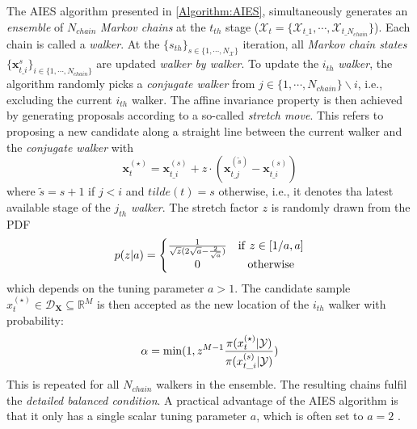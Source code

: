 The \acrshort{AIES} algorithm presented in \ref{Algorithm:AIES}, simultaneously generates an \textit{ensemble} of $N_{chain}$ \textit{Markov chains} at the $t_{th}$ stage ($\mathcal{X}_{t} = \{ \mathcal{X}_{t\_1},\cdots,\mathcal{X}_{t\_N_{chain}}\}$). Each chain is called a \textit{walker}. At the $\{s_{th}\}_{s \in \{1,\cdots,N_{\mathcal{X}}\}}$ iteration, all \textit{Markov chain states} $\{\boldsymbol{x}_{t\_i}^{s}\}_{i \in \{1,\cdots,N_{chain}\}}$ are updated \textit{walker by walker}. To update the $i_{th}$ \textit{walker}, the algorithm randomly picks a \textit{conjugate walker} from $j \in \{ 1,\cdots,N_{chain}\} \backslash i$, i.e., excluding the current $i_{th}$ walker. The affine invariance property is then achieved by generating proposals according to a so-called \textit{stretch move}. This refers to proposing a new candidate along a straight line between the current walker and the \textit{conjugate walker} with
\begin{equation}
    \label{eq: AIES walker}
\boldsymbol{x}_{t}^{(\star)}
=
\boldsymbol{x}_{t\_i}^{(s)}
+
z \cdot 
(\boldsymbol{x}_{t\_j}^{(\tilde{s})} - \boldsymbol{x}_{t\_i}^{(s)})
\end{equation}
where $\tilde{s} = s +1$ if $j < i$ and $tilde(t)=s$ otherwise, i.e., it denotes tha latest available stage of the $j_{th}$ \textit{walker}. The stretch factor $z$ is randomly drawn from the \acrshort{PDF}
\begin{equation}
    \label{eq: AIES Z}
    p(z|a)= \left\{\begin{matrix}
  \frac{1}{\sqrt{z} (2\sqrt{a} - \frac{2}{\sqrt{a} } )}  & {\rm{if} }\ z \in [1 / a, a]  \\
  0 & {\rm{otherwise} }
\end{matrix}\right.
\end{equation}
which depends on the tuning parameter $a>1$. The candidate sample ${x}_{t}^{(\star)} \in \mathcal{D}_{\boldsymbol{X}} \subseteq \mathbb{R}^{M}$ is then accepted as the new location of the $i_{th}$ walker with probability:
\begin{equation}
    \label{eq: AIES acceptance probability}
    \alpha = {\rm{min}}
(1,
z^{M-1} 
\frac{\pi({x}_{t}^{(\star)}|\mathcal{Y})}
{\pi({x}_{t\_{i}}^{(s)}|\mathcal{Y})} 
)
\end{equation}
This is repeated for all $N_{chain}$ walkers in the ensemble. The resulting chains fulfil the \textit{detailed balanced condition}. A practical advantage of the \acrshort{AIES} algorithm is that it only has a single scalar tuning parameter $a$, which is often set to $a=2$ \citep{UQdoc}.
